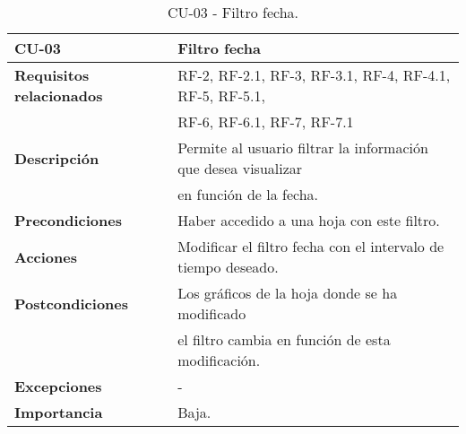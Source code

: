 \begin{table}[ht!]
    \centering
    \resizebox{15cm}{!} {
    \begin{tabular}{|l|l|}
    \hline
         \textbf{CU-03}     &  \textbf{Filtro fecha} \\ \hline
         \textbf{Requisitos relacionados}       & RF-2, RF-2.1, RF-3, RF-3.1, RF-4, RF-4.1, RF-5, RF-5.1,\\& RF-6, RF-6.1, RF-7, RF-7.1 \\ \hline
         \textbf{Descripción}    & Permite al usuario filtrar la información que desea visualizar \\&en función de la fecha. \\ \hline   
         \textbf{Precondiciones}      & Haber accedido a una hoja con este filtro. \\ \hline
         \textbf{Acciones}      & Modificar el filtro fecha con el intervalo de tiempo deseado. \\ \hline
         \textbf{Postcondiciones}       & Los gráficos de la hoja donde se ha modificado \\&el filtro cambia en función de esta modificación. \\ \hline
         \textbf{Excepciones}       & -\\ \hline
         \textbf{Importancia}   &Baja. \\
         \hline
    \end{tabular}}
    \caption{CU-03 - Filtro fecha.}
    \label{tab:my_label}
\end{table}
